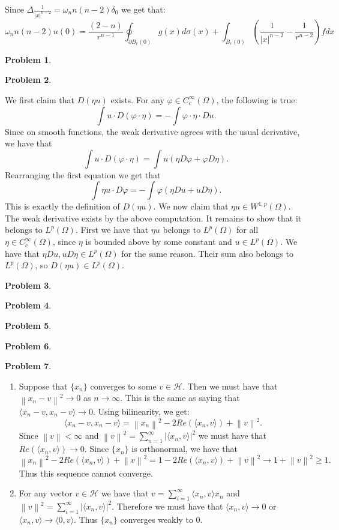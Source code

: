 \documentclass[12pt, a4paper]{article}
\newtheorem{problem}{Problem}
\theoremstyle{definition}
\newcommand{\penum}{ \begin{enumerate}[label=\bf(\alph*), leftmargin=0pt]}
\newcommand{\epenum}{ \end{enumerate} }
\newcommand{\bd}{\partial}
\newcommand{\lan}{\langle}
\newcommand{\ran}{\rangle}
\newcommand{\norm}[1]{\left\lVert#1\right\rVert}
\newcommand{\inn}[1]{\lan#1\ran}
\begin{document}
Since $\Delta \frac{1}{|x|^{n-2}}= \omega_n n(n-2)\delta_0$ we get that:
$$\omega_n n(n-2) u(0) = \frac{(2-n)}{r^{n-1}} \oint_{\bd B_r(0)}g(x)d\sigma(x) + \int_{B_r(0)} \left( \frac{1}{|x|^{n-2}} - \frac{1}{r^{n-2}}\right) f dx  $$
\newpage
\begin{problem}
\end{problem}
\newpage
\begin{problem}
\end{problem}
We first claim that $D(\eta u)$ exists. For any $\varphi \in C_c^\infty(\Omega)$, the following is true: 
$$\int u \cdot D(\varphi \cdot \eta) = - \int \varphi \cdot \eta \cdot Du.$$
Since on smooth functions, the weak derivative agrees with the usual derivative, we have that $$\int u \cdot D(\varphi \cdot \eta) = \int u \left(\eta D\varphi + \varphi D \eta\right).$$
Rearranging the first equation we get that 
$$\int \eta u \cdot D\varphi = - \int\varphi \left( \eta Du + u D \eta \right).$$
This is exactly the definition of $D(\eta u)$. We now claim that $\eta u \in W^{1,p}(\Omega)$.
The weak derivative exists by the above computation. It remains to show that it belongs to $L^p(\Omega)$. First we have that $\eta u$ belongs to $L^p(\Omega)$ for all $\eta \in C_c^\infty(\Omega)$, since $\eta$ is bounded above by some constant and $u\in L^p(\Omega)$. We have that $\eta Du, u D\eta\in L^p(\Omega)$ for the same reason. Their sum also belongs to $L^p(\Omega)$, so $D(\eta u)\in L^p(\Omega)$. 
\newpage
\begin{problem}
\end{problem}
\newpage
\begin{problem}
\end{problem}
\newpage
\begin{problem}
\end{problem}
\newpage
\begin{problem}
\end{problem}
\newpage
\begin{problem}
\end{problem}
\penum
\item 
Suppose that $\{x_n\}$ converges to some $v \in \mathcal{H}$. Then we must have that $\norm{x_n - v}^2\to 0$ as $n \to \infty$. This is the same as saying that $\inn{x_n - v, x_n-v} \to 0$. Using bilinearity, we get:
$$\inn{x_n - v, x_n-v}  = \norm{x_n}^2 - 2 Re(\inn{x_n,v}) + \norm{v}^2. $$ Since $\norm{v} <\infty$ and $\norm{v}^2 = \sum_{n=1}^\infty |\inn{x_n,v}|^2$ we must have that $Re(\inn{x_n,v}) \to 0$. Since $\{x_n\}$ is orthonormal, we have that 
$$\norm{x_n}^2 - 2Re(\inn{x_n,v}) + \norm{v}^2 = 1 - 2 Re(\inn{x_n,v}) + \norm{v}^2 \to 1 + \norm{v}^2 \geq 1.$$
Thus this sequence cannot converge. 
\item For any vector $v\in \mathcal{H}$ we have that $v = \sum_{i=1}^\infty \inn{x_n,v}x_n$ and $\norm{v}^2 = \sum_{i=1}^\infty |\inn{x_n,v}|^2$. Therefore we must have that $\inn{x_n,v} \to 0$ or $\inn{x_n,v} \to \inn{0,v}$. Thus $\{x_n\}$ converges weakly to $0$. 

\epenum
\end{document}
